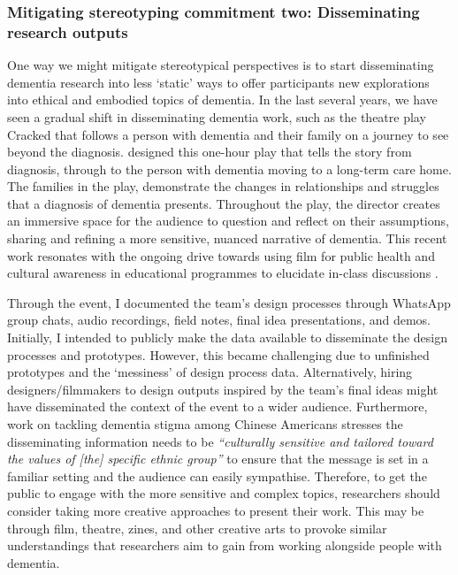 \subsubsection{Mitigating stereotyping commitment two: Disseminating research outputs}
\label{DiscussionOne:CommitmentThree}
One way we might mitigate stereotypical perspectives is to start disseminating dementia research into less `static' ways to offer participants new explorations into ethical and embodied topics of dementia. In the last several years, we have seen a gradual shift in disseminating dementia work, such as the theatre play Cracked that follows a person with dementia and their family on a journey to see beyond the diagnosis. \cite{kontos_raising_2018}  designed this one-hour play that tells the story from diagnosis, through to the person with dementia moving to a long-term care home. The families in the play, demonstrate the changes in relationships and struggles that a diagnosis of dementia presents. Throughout the play, the director creates an immersive space for the audience to question and reflect on their assumptions, sharing and refining a more sensitive, nuanced narrative of dementia. This recent work resonates with the ongoing drive towards using film for public health and cultural awareness in educational programmes to elucidate in-class discussions \citep{botchway2017films}. 

Through the event, I documented the team's design processes through WhatsApp group chats, audio recordings, field notes, final idea presentations, and demos. Initially, I intended to publicly make the data available to disseminate the design processes and prototypes. However, this became challenging due to unfinished prototypes and the `messiness' of design process data. Alternatively, hiring designers/filmmakers to design outputs inspired by the team’s final ideas might have disseminated the context of the event to a wider audience. Furthermore, \cite{zheng2016exploring} work on tackling dementia stigma among Chinese Americans stresses the disseminating information needs to be \textit{``culturally sensitive and tailored toward the values of [the] specific ethnic group''} to ensure that the message is set in a familiar setting and the audience can easily sympathise. Therefore, to get the public to engage with the more sensitive and complex topics, researchers should consider taking more creative approaches to present their work. This may be through film, theatre, zines, and other creative arts to provoke similar understandings that researchers aim to gain from working alongside people with dementia.

